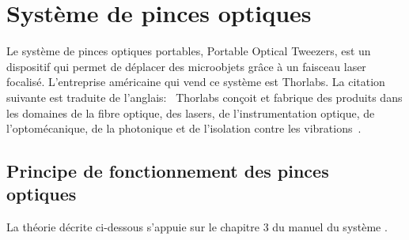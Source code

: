 


\section{Système de pinces optiques}

Le système de pinces optiques portables, Portable Optical Tweezers, est un dispositif qui permet de déplacer des microobjets grâce à un faisceau laser focalisé. L'entreprise américaine qui vend ce système est Thorlabs. La citation suivante est traduite de l'anglais: \guillemotleft{}~Thorlabs conçoit et fabrique des produits dans les domaines de la fibre optique, des lasers, de l'instrumentation optique, de l'optomécanique, de la photonique et de l'isolation contre les vibrations~\guillemotright{}\cite{thorlabsWikipedia}.

\subsection{Principe de fonctionnement des pinces optiques}

La théorie décrite ci-dessous s'appuie sur le chapitre 3 du manuel du système \cite{manualPortableOpticalTweezers}.

